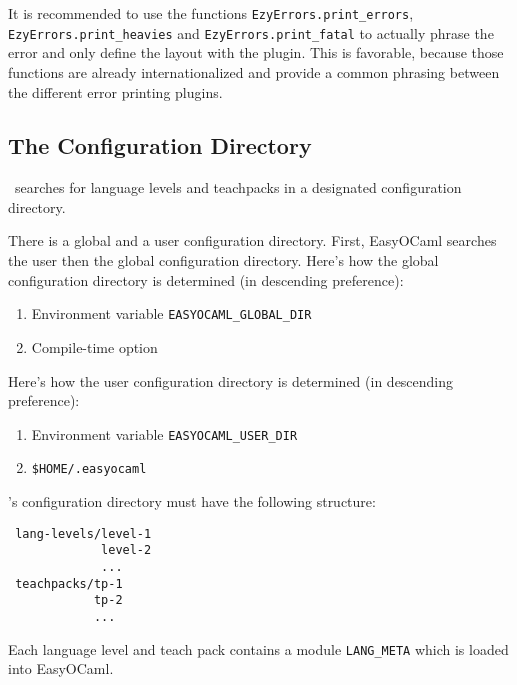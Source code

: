 It is recommended to use the functions \texttt{EzyErrors.print\_errors},
\texttt{EzyErrors.print\_heavies} and \texttt{EzyErrors.print\_fatal} to
actually phrase the error and only define the layout with the plugin. This is
favorable, because those functions are already internationalized and provide a
common phrasing between the different error printing plugins.

\subsection{The Configuration Directory}
\label{sec:directory}

\easyocaml\ searches for language levels and teachpacks in a designated
configuration directory.

There is a global and a user configuration directory. First, EasyOCaml 
searches the user then the global configuration directory.  Here's how 
the global configuration directory is determined (in descending 
preference):

\begin{enumerate}
    \item Environment variable \texttt{EASYOCAML\_GLOBAL\_DIR}
    \item Compile-time option
\end{enumerate}

Here's how the user configuration directory is determined (in descending 
preference):

\begin{enumerate}
    \item Environment variable \texttt{EASYOCAML\_USER\_DIR}
    \item \texttt{\$HOME/.easyocaml}
\end{enumerate}

\easyocaml's configuration directory must have the following structure:

\begin{verbatim}
 lang-levels/level-1
             level-2
             ...
 teachpacks/tp-1
            tp-2
            ...
\end{verbatim}

Each language level and teach pack contains a module \texttt{LANG\_META} 
which is loaded into EasyOCaml.

